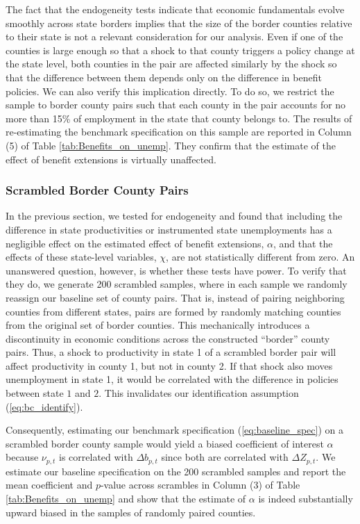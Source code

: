 \documentclass[12pt]{article}
\newcommand{\1}{\mathbf{1}}
\begin{document}
The fact that the endogeneity tests indicate that economic fundamentals evolve smoothly across state borders implies that the size of the border counties relative to their state is not a relevant consideration for our analysis. Even if one of the counties is large enough so that a shock to that county triggers a policy change at the state level, both counties in the pair are affected similarly by the shock so that the difference between them depends only on the difference in benefit policies. We can also verify this implication directly. To do so, we restrict the sample to border county pairs such that each county in the pair accounts for no more than 15\% of employment in the state that county belongs to. The results of re-estimating the benchmark specification on this sample are reported in Column (5) of Table  \ref{tab:Benefits_on_unemp}. They confirm that the estimate of the effect of benefit extensions is virtually unaffected.



\subsubsection{Scrambled Border County Pairs}

In the previous section, we tested for endogeneity and found that including the difference in state productivities or instrumented state unemployments has a negligible effect on the estimated effect of benefit extensions, $\alpha$, and that the effects of these state-level variables, $\chi$, are not statistically different from zero. An unanswered question, however, is whether these tests have power. To verify that they do, we generate 200 scrambled samples, where in each sample we randomly reassign our baseline set of county pairs. That is, instead of pairing neighboring counties from different states, pairs are formed by randomly matching counties from the original set of border counties. This mechanically introduces a discontinuity in economic conditions across the constructed ``border'' county pairs. Thus, a shock to productivity in state 1 of a scrambled border pair will affect productivity in county 1, but not in county 2. If that shock also moves unemployment in state 1, it would be correlated with the difference in policies between state $1$ and $2$. This invalidates our identification assumption (\ref{eq:bc_identify}).

Consequently, estimating our benchmark specification (\ref{eq:baseline_spec}) on a scrambled border county sample would yield a biased coefficient of interest $\alpha$ because $\nu_{p,t}$ is correlated with $\Delta b_{p,t}$ since both are correlated with $\Delta Z_{p,t}$. We estimate our baseline specification on the 200 scrambled samples and report the mean coefficient and $p$-value across scrambles in Column (3) of Table \ref{tab:Benefits_on_unemp} and show that the estimate of $\alpha$ is indeed substantially upward biased in the samples of randomly paired counties.
\end{document}
